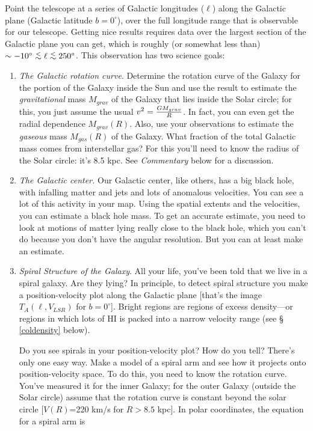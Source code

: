 \documentclass[psfig,preprint]{aastex}
\begin{document}
	Point the telescope at a series of Galactic longitudes ($\ell$)
along the Galactic plane (Galactic latitude $b = 0^\circ$), over the
full longitude range that is observable for our telescope.  Getting nice
results requires data over the largest section of the Galactic plane you
can get, which is roughly (or somewhat less than) $\sim -10^\circ \simlt
\ell \simlt 250^\circ$. This observation has two science goals:
\begin{enumerate}

	\item {\it The Galactic rotation curve}. Determine the rotation
curve of the Galaxy for the portion of the Galaxy inside the Sun and use
the result to estimate the {\it gravitational} mass $M_{grav}$ of the
Galaxy that lies inside the Solar circle; for this, you just assume the
usual $v^2 = {G M_{grav} \over R}$.  In fact, you can even get the
radial dependence $M_{grav}(R)$. Also, use your observations to estimate
the {\it gaseous} mass $M_{gas}(R)$ of the Galaxy.  What fraction of the
total Galactic mass comes from interstellar gas? For this you'll need to
know the radius of the Solar circle: it's 8.5 kpc.  See {\it Commentary}
below for a discussion. 

\item {\it The Galactic center.} Our Galactic center, like others, has a
  big black hole, with infalling matter and jets and lots of anomalous
  velocities. You can see a lot of this activity in  your map. Using the
  spatial extents and the velocities, you can estimate a black hole
  mass. To get an accurate estimate, you need to look at motions of
  matter lying really close to the black hole, which you can't do
  because you don't have the angular resolution. But you can at least
  make an estimate.

	\item {\it Spiral Structure of the Galaxy}. All your life,
you've been told that we live in a spiral galaxy.  Are they lying? In
principle, to detect spiral structure you make a position-velocity plot
along the Galactic plane [that's the image $T_A(\ell,V_{LSR})$ for
$b=0^\circ$].  Bright regions are regions of excess density---or regions in
which lots of HI is packed into a narrow velocity range (see \S
\ref{coldensity} below). 

	Do you see spirals in your position-velocity plot? How do you
tell? There's only one easy way.  Make a model of a spiral arm and see
how it projects onto position-velocity space.  To do this, you need to
know the rotation curve.  You've measured it for the inner Galaxy; for
the outer Galaxy (outside the Solar circle) assume that the rotation
curve is constant beyond the solar circle [$V(R)$=220 km/s for $R > 8.5$
kpc].  In polar coordinates, the equation for a spiral arm is


\end{enumerate}
\end{document}
